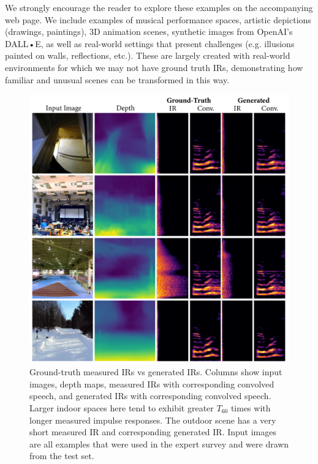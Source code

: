 \documentclass[10pt,twocolumn,letterpaper]{article}
\begin{document}
We strongly encourage the reader to explore these examples on the accompanying web page. We include examples of musical performance spaces, artistic depictions (drawings, paintings), 3D animation scenes, synthetic images from OpenAI's DALL•E, as well as real-world settings that present challenges (e.g. illusions painted on walls, reflections, etc.). These are largely created with real-world environments for which we may not have ground truth IRs, demonstrating how familiar and unusual scenes can be transformed in this way.


\begin{figure}
    \centering
    \includegraphics[width=\columnwidth]{p_gt_ir_sig.png}
    \caption{Ground-truth measured IRs vs generated IRs. Columns show input images, depth maps, measured IRs with corresponding convolved speech, and generated IRs with corresponding convolved speech. Larger indoor spaces here tend to exhibit greater $T_{60}$ times with longer measured impulse responses. The outdoor scene has a very short measured IR and corresponding generated IR. Input images are all examples that were used in the expert survey and were drawn from the test set.}
    \label{fig:p_groundtruth}
\end{figure}
\end{document}
